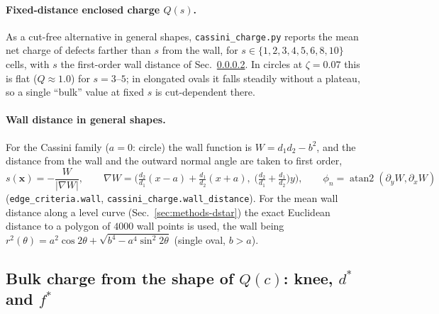 \paragraph{Fixed-distance enclosed charge $Q(s)$.}
As a cut-free alternative in general shapes, \texttt{cassini\_charge.py} reports the mean
net charge of defects farther than $s$ from the wall, for $s\in\{1,2,3,4,5,6,8,10\}$
cells, with $s$ the first-order wall distance of Sec.~\ref{sec:methods-walldist}.
In circles at $\zeta=0.07$ this is flat ($Q\approx1.0$) for $s=3$--$5$; in elongated ovals it
falls steadily without a plateau, so a single ``bulk'' value at fixed $s$ is cut-dependent there.

\paragraph{Wall distance in general shapes.}
\label{sec:methods-walldist}
For the Cassini family ($a=0$: circle) the wall function is $W=d_1d_2-b^2$, and the distance
from the wall and the outward normal angle are taken to first order,
\begin{equation}
  s(\mathbf{x}) = -\frac{W}{|\nabla W|},\qquad
  \nabla W = \Big(\tfrac{d_2}{d_1}(x-a)+\tfrac{d_1}{d_2}(x+a),\;
  \big(\tfrac{d_2}{d_1}+\tfrac{d_1}{d_2}\big)y\Big),\qquad
  \phi_n = \operatorname{atan2}(\partial_yW,\partial_xW)
\end{equation}
(\texttt{edge\_criteria.wall}, \texttt{cassini\_charge.wall\_distance}).
For the mean wall distance along a level curve (Sec.~\ref{sec:methods-dstar}) the exact
Euclidean distance to a polygon of $4000$ wall points is used, the wall being
$r^2(\theta)=a^2\cos2\theta+\sqrt{b^4-a^4\sin^2 2\theta}$ (single oval, $b>a$).

\subsection{Bulk charge from the shape of $Q(c)$: knee, $d^*$ and $f^*$}
\label{sec:methods-knee}

